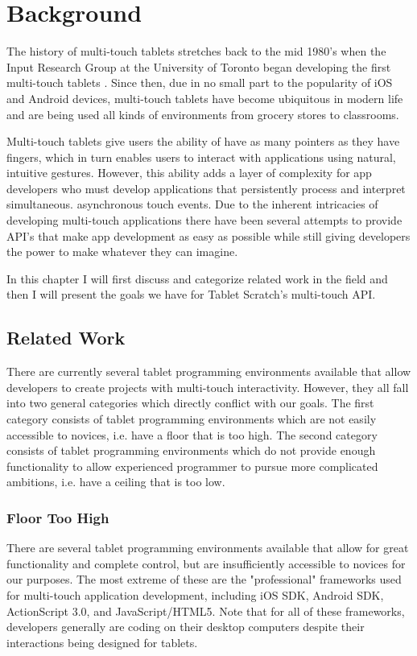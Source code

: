 \chapter{Background}
The history of multi-touch tablets stretches back to the mid 1980's when the Input Research Group at the University of Toronto began developing the first multi-touch tablets \cite{LBS, Mehta}. Since then, due in no small part to the popularity of iOS and Android devices, multi-touch tablets have become ubiquitous in modern life and are being used all kinds of environments from grocery stores to classrooms.

Multi-touch tablets give users the ability of have as many pointers as they have fingers, which in turn enables users to interact with applications using natural, intuitive gestures. However, this ability adds a layer of complexity for app developers who must develop applications that persistently process and interpret simultaneous. asynchronous touch events. Due to the inherent intricacies of developing multi-touch applications there have been several attempts to provide API's that make app development as easy as possible while still giving developers the power to make whatever they can imagine.

In this chapter I will first discuss and categorize related work in the field and then I will present the goals we have for Tablet Scratch's multi-touch API.
 
\section{Related Work}
There are currently several tablet programming environments available that allow developers to create projects with multi-touch interactivity. However, they all fall into two general categories which directly conflict with our goals. The first category consists of tablet programming environments which are not easily accessible to novices, i.e. have a floor that is too high. The second category consists of tablet programming environments which do not provide enough functionality to allow experienced programmer to pursue more complicated ambitions, i.e. have a ceiling that is too low. 

\subsection{Floor Too High}
There are several tablet programming environments available that allow for great functionality and complete control, but are insufficiently accessible to novices for our purposes. The most extreme of these are the "professional" frameworks used for multi-touch application development, including iOS SDK, Android SDK, ActionScript 3.0, and JavaScript/HTML5. Note that for all of these frameworks, developers generally are coding on their desktop computers despite their interactions being designed for tablets.

